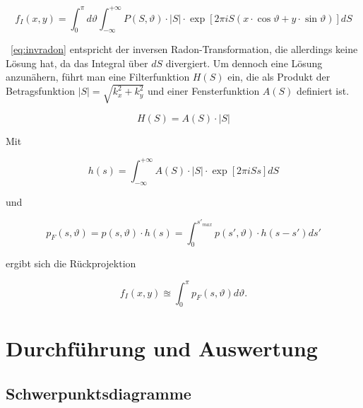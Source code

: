 \documentclass[slug=PET, room=Andreas-Schubert-Bau\,\ 424A, supervisor=Carsten\ Bittrich, coursedate=10.\ 01.\ 2020]{../../Lab_Report_LaTeX/lab_report}
\begin{document}
\begin{equation}\label{eq:invradon}
	f_I(x,y) = \int_{0}^{\pi} d\vartheta \int_{-\infty}^{+\infty} P(S, \vartheta) \cdot |S| \cdot \exp[2\pi i S(x \cdot \cos\vartheta + y \cdot \sin\vartheta)] dS
\end{equation}

~\eqref{eq:invradon} entspricht der inversen Radon-Transformation, die allerdings keine Lösung
hat, da das Integral über \(dS\) divergiert.
Um dennoch eine Lösung anzunähern, führt man eine Filterfunktion \(H(S)\) ein, die als Produkt der
Betragsfunktion \(|S| = \sqrt{k_x^2+k_y^2}\) und einer Fensterfunktion \(A(S)\) definiert ist.

\begin{equation}\label{eq:filterfkt}
	H(S) = A(S) \cdot |S|
\end{equation}

Mit

\begin{equation}\label{eq:filterkern}
	h(s) = \int_{-\infty}^{+\infty} A(S) \cdot |S| \cdot \exp[2\pi i Ss] dS
\end{equation}

und

\begin{equation}\label{eq:gefltdaten}
	p_F(s, \vartheta) = p(s, \vartheta) \cdot h(s) = \int_{0}^{s'_{max}} p(s', \vartheta) \cdot h(s-s') ds'
\end{equation}

ergibt sich die Rückprojektion

\begin{equation}\label{eq:rücktrafo}
	f_I(x,y) \approxeq \int_{0}^{\pi} p_F(s,\vartheta) d\vartheta .
\end{equation}

\section{Durchführung und Auswertung}
\label{sec:durch}

\subsection{Schwerpunktsdiagramme}
\label{sec:schwpkt}
\end{document}
